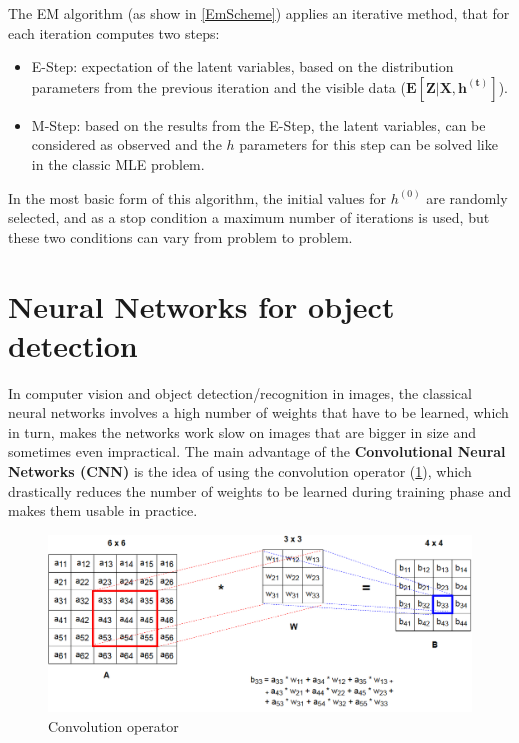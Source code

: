  The EM algorithm (as show in \ref{EmScheme}) applies an iterative method, that for each iteration computes two steps:
 \begin{itemize}
 	\item E-Step: expectation of the latent variables, based on the distribution parameters from the previous iteration and the visible data ($\mathbf{E[Z | X, h^{(t)}]}$).
 	\item M-Step: based on the results from the E-Step, the latent variables, can be considered as observed and the $h$ parameters for this step can be solved like in the classic MLE problem.
 \end{itemize}

In the most basic form of this algorithm, the initial values for $h^{(0)}$ are randomly selected, and as a stop condition a maximum number of iterations is  used, but these two conditions can vary from problem to problem.
 
 
\section{Neural Networks for object detection}
In computer vision and object detection/recognition in images, the classical neural networks involves a high number of weights that have to be learned, which in turn, makes the networks work slow on images that are bigger in size and sometimes even impractical. The main advantage of the \textbf{Convolutional Neural Networks (CNN)} \cite{ConvNeuralNetwork} is the idea of using the convolution operator (\ref{Convolution}), which drastically reduces the number of weights to be learned during training phase and makes them usable in practice.

 \begin{figure}[H]
	\includegraphics[width=\textwidth]{Pictures/006Convolution.png}
	\caption{Convolution operator \cite{ConvNeuralNetwork}}
	\label{Convolution}
\end{figure}

